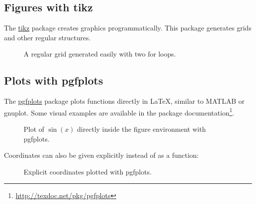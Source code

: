 \subsection{Figures with tikz}

The \href{https://ctan.org/pkg/pgf}{tikz} package creates graphics programmatically.
This package generates grids and other regular structures.

\begin{ltgexample}
\begin{figure}[ht]
  \centering
  \caption{A regular grid generated easily with two for loops.}\label{fig:tikz_example}
\end{figure}
\end{ltgexample}

\subsection{Plots with pgfplots}

The \href{https://ctan.org/pkg/pgfplots}{pgfplots} package plots functions directly in \LaTeX{}, similar to MATLAB or gnuplot.
Some visual examples are available in the package documentation\footnote{\url{http://texdoc.net/pkg/pgfplots}}.

\begin{ltgexample}
\begin{figure}[ht]
  \centering
  \caption{Plot of $\sin(x)$ directly inside the figure environment with pgfplots.}
  \label{fig:pgfplots_example}
\end{figure}
\end{ltgexample}

Coordinates can also be given explicitly instead of as a function:
\begin{ltgexample}
\begin{figure}[ht]
  \centering
  \caption{Explicit coordinates plotted with pgfplots.}
  \label{fig:pgfplots_coords}
\end{figure}
\end{ltgexample}

